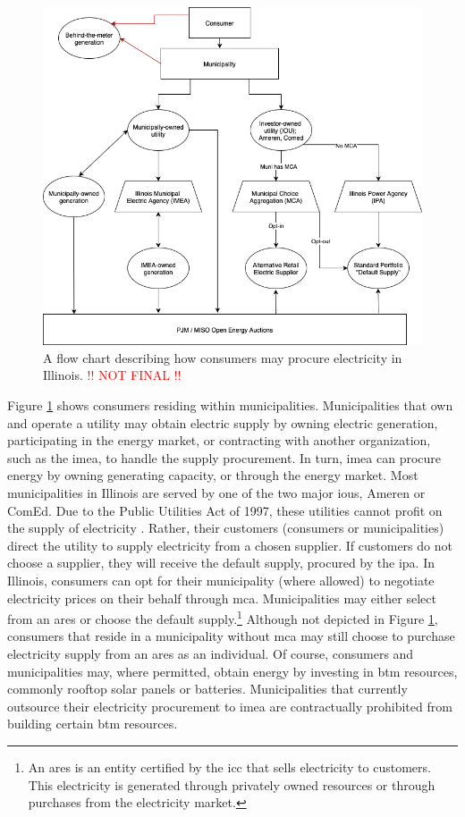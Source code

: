 \begin{figure}[ht!]
    \centering
    \includegraphics[width=0.75\columnwidth]{figures/07_interview_chapter/illinois-electric-choice.drawio.png}
    \caption{A flow chart describing how consumers may procure electricity in
    Illinois. \textcolor{red}{!! NOT FINAL !!}}
    \label{fig:illinois-flow-chart}
\end{figure}

Figure \ref{fig:illinois-flow-chart} shows consumers residing within
municipalities. Municipalities that own and operate a utility may obtain
electric supply by owning electric generation, participating in the energy
market, or contracting with another organization, such as the \ac{imea}, to
handle the supply procurement. In turn, \ac{imea} can procure energy by owning
generating capacity, or through the energy market. Most municipalities in
Illinois are served by one of the two major \acp{iou}, Ameren or ComEd. Due to
the Public Utilities Act of 1997, these utilities cannot profit on the supply of
electricity \cite{illinois_90th_general_assembly_electric_1997}. Rather, their
customers (consumers or municipalities) direct the utility to supply electricity
from a chosen supplier. If customers do not choose a supplier, they will receive
the default supply, procured by the \ac{ipa}. In Illinois, consumers can opt for
their municipality (where allowed) to negotiate electricity prices on their
behalf through \ac{mca}. Municipalities may either select from an \ac{ares} or
choose the default supply.\footnote{An \ac{ares} is an entity certified by the
\ac{icc} that sells electricity to customers. This electricity is generated
through privately owned resources or through purchases from the electricity
market.} Although not depicted in Figure \ref{fig:illinois-flow-chart},
consumers that reside in a municipality without \ac{mca} may still choose to
purchase electricity supply from an \ac{ares} as an individual. Of course,
consumers and municipalities may, where permitted, obtain energy by investing in
\ac{btm} resources, commonly rooftop solar panels or batteries. Municipalities
that currently outsource their electricity procurement to \ac{imea} are
contractually prohibited from building certain \ac{btm} resources.
 
